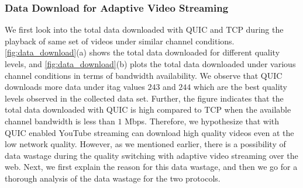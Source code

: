\subsubsection{Data Download for Adaptive Video Streaming}
We first look into the total data downloaded with \ac{QUIC} and \ac{TCP} during the playback of same set of videos under similar channel conditions. \fig\ref{fig:data_download}(a) shows the total data downloaded for different quality levels, and \fig\ref{fig:data_download}(b) plots the total data downloaded under various channel conditions in terms of bandwidth availability. We observe that \ac{QUIC} downloads more data under itag values $243$ and $244$ which are the best quality levels observed in the collected data set. 
Further, the figure indicates that the total data downloaded with \ac{QUIC} is high compared to \ac{TCP} when the available channel bandwidth is less than $1$ Mbps. Therefore, we hypothesize that with \ac{QUIC} enabled YouTube streaming can download high quality videos even at the low network quality. 
However, as we mentioned earlier, there is a possibility of data wastage during the quality switching with adaptive video streaming over the web. Next, we first explain the reason for this data wastage, and then we go for a thorough analysis of the data wastage for the two protocols. 





